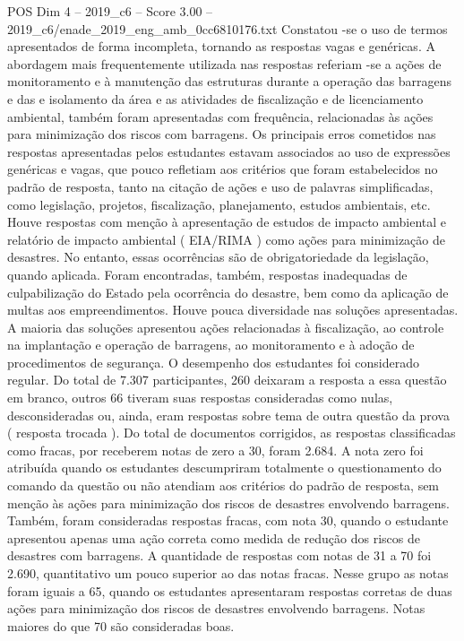\begin{textsample}{POS Dim 4 – 2019\_c6 – Score 3.00 – 2019\_c6/enade\_2019\_eng\_amb\_0cc6810176.txt}
Constatou -se o uso de termos apresentados de forma incompleta, tornando as respostas vagas e genéricas.
A abordagem mais frequentemente utilizada nas respostas referiam -se a ações de monitoramento e à manutenção das estruturas durante a operação das barragens e das e isolamento da área e as atividades de fiscalização e de licenciamento ambiental, também foram apresentadas com frequência, relacionadas às ações para minimização dos riscos com barragens.
Os principais erros cometidos nas respostas apresentadas pelos estudantes estavam associados ao uso de expressões genéricas e vagas, que pouco refletiam aos critérios que foram estabelecidos no padrão de resposta, tanto na citação de ações e uso de palavras simplificadas, como legislação, projetos, fiscalização, planejamento, estudos ambientais, etc.
Houve respostas com menção à apresentação de estudos de impacto ambiental e relatório de impacto ambiental ( EIA/RIMA ) como ações para minimização de desastres.
No entanto, essas ocorrências são de obrigatoriedade da legislação, quando aplicada.
Foram encontradas, também, respostas inadequadas de culpabilização do Estado pela ocorrência do desastre, bem como da aplicação de multas aos empreendimentos.
Houve pouca diversidade nas soluções apresentadas.
A maioria das soluções apresentou ações relacionadas à fiscalização, ao controle na implantação e operação de barragens, ao monitoramento e à adoção de procedimentos de segurança.
O desempenho dos estudantes foi considerado regular.
Do total de 7.307 participantes, 260 deixaram a resposta a essa questão em branco, outros 66 tiveram suas respostas consideradas como nulas, desconsideradas ou, ainda, eram respostas sobre tema de outra questão da prova ( resposta trocada ).
Do total de documentos corrigidos, as respostas classificadas como fracas, por receberem notas de zero a 30, foram 2.684.
A nota zero foi atribuída quando os estudantes descumpriram totalmente o questionamento do comando da questão ou não atendiam aos critérios do padrão de resposta, sem menção às ações para minimização dos riscos de desastres envolvendo barragens.
Também, foram consideradas respostas fracas, com nota 30, quando o estudante apresentou apenas uma ação correta como medida de redução dos riscos de desastres com barragens.
A quantidade de respostas com notas de 31 a 70 foi 2.690, quantitativo um pouco superior ao das notas fracas.
Nesse grupo as notas foram iguais a 65, quando os estudantes apresentaram respostas corretas de duas ações para minimização dos riscos de desastres envolvendo barragens.
Notas maiores do que 70 são consideradas boas.

\end{textsample}
